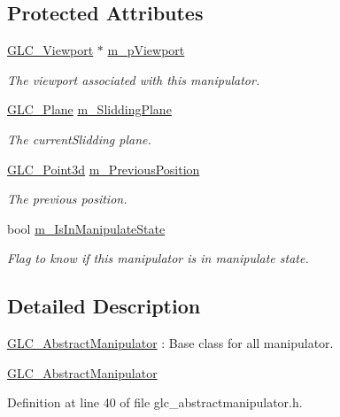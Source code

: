 \subsection*{Protected Attributes}
\begin{DoxyCompactItemize}
\item 
\hyperlink{class_g_l_c___viewport}{G\-L\-C\-\_\-\-Viewport} $\ast$ \hyperlink{class_g_l_c___abstract_manipulator_aedaf22a999525d7d14b8f366d97d19e2}{m\-\_\-p\-Viewport}
\begin{DoxyCompactList}\small\item\em The viewport associated with this manipulator. \end{DoxyCompactList}\item 
\hyperlink{class_g_l_c___plane}{G\-L\-C\-\_\-\-Plane} \hyperlink{class_g_l_c___abstract_manipulator_a49a526b5e0fccbb46e812ca8d609d56f}{m\-\_\-\-Slidding\-Plane}
\begin{DoxyCompactList}\small\item\em The current\-Slidding plane. \end{DoxyCompactList}\item 
\hyperlink{glc__vector3d_8h_a4e13a9bbc7ab3d34de7e98b41836772c}{G\-L\-C\-\_\-\-Point3d} \hyperlink{class_g_l_c___abstract_manipulator_a686032db93afdc2bee8248bded9c74dc}{m\-\_\-\-Previous\-Position}
\begin{DoxyCompactList}\small\item\em The previous position. \end{DoxyCompactList}\item 
bool \hyperlink{class_g_l_c___abstract_manipulator_ace23989bdf7072dcecd4f005e5b95485}{m\-\_\-\-Is\-In\-Manipulate\-State}
\begin{DoxyCompactList}\small\item\em Flag to know if this manipulator is in manipulate state. \end{DoxyCompactList}\end{DoxyCompactItemize}


\subsection{Detailed Description}
\hyperlink{class_g_l_c___abstract_manipulator}{G\-L\-C\-\_\-\-Abstract\-Manipulator} \-: Base class for all manipulator. 

\hyperlink{class_g_l_c___abstract_manipulator}{G\-L\-C\-\_\-\-Abstract\-Manipulator} 

Definition at line 40 of file glc\-\_\-abstractmanipulator.\-h.



